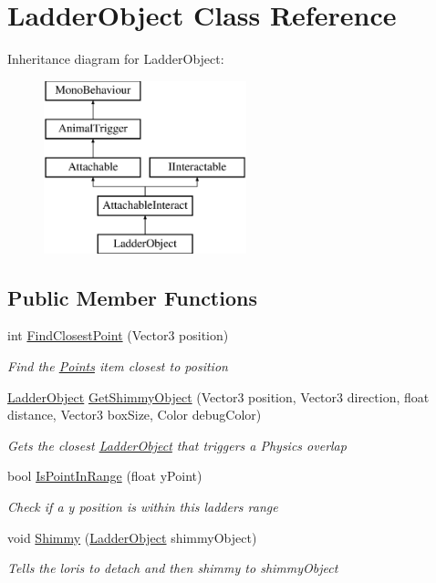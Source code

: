\hypertarget{class_ladder_object}{}\section{Ladder\+Object Class Reference}
\label{class_ladder_object}
Inheritance diagram for Ladder\+Object\+:\begin{figure}[H]
\begin{center}
\leavevmode
\includegraphics[height=5.000000cm]{class_ladder_object}
\end{center}
\end{figure}
\subsection*{Public Member Functions}
\begin{DoxyCompactItemize}
\item 
int \mbox{\hyperlink{class_ladder_object_aafddc5cca113a7d13673a778c6edb9ac}{Find\+Closest\+Point}} (Vector3 position)
\begin{DoxyCompactList}\small\item\em Find the \mbox{\hyperlink{class_ladder_object_a6d87f62a0637a961b199cbc46947f268}{Points}} item closest to {\itshape position}  \end{DoxyCompactList}\item 
\mbox{\hyperlink{class_ladder_object}{Ladder\+Object}} \mbox{\hyperlink{class_ladder_object_a445278889295eecb94978527519a939d}{Get\+Shimmy\+Object}} (Vector3 position, Vector3 direction, float distance, Vector3 box\+Size, Color debug\+Color)
\begin{DoxyCompactList}\small\item\em Gets the closest \mbox{\hyperlink{class_ladder_object}{Ladder\+Object}} that triggers a Physics overlap \end{DoxyCompactList}\item 
bool \mbox{\hyperlink{class_ladder_object_a0471a8e39366827430f1d685e02947a4}{Is\+Point\+In\+Range}} (float y\+Point)
\begin{DoxyCompactList}\small\item\em Check if a y position is within this ladder\textquotesingle{}s range \end{DoxyCompactList}\item 
void \mbox{\hyperlink{class_ladder_object_a08d0308b642574244b62c2281a1f03c7}{Shimmy}} (\mbox{\hyperlink{class_ladder_object}{Ladder\+Object}} shimmy\+Object)
\begin{DoxyCompactList}\small\item\em Tells the loris to detach and then shimmy to {\itshape shimmy\+Object}  \end{DoxyCompactList}\end{DoxyCompactItemize}
